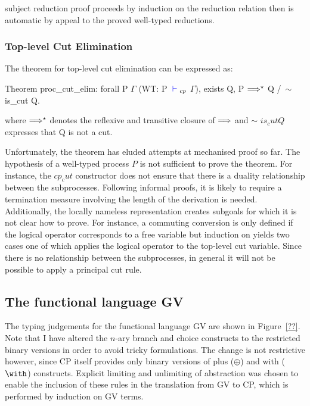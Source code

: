 
subject reduction proof proceeds by induction on the reduction relation then
is automatic by appeal to the proved well-typed reductions.


\subsubsection{Top-level Cut Elimination}

The theorem for top-level cut elimination can be expressed as:
\begin{coq}
Theorem proc_cut_elim:
  forall P $\Gamma$
         (WT: P ${\color{blue} {} \vdash {}}_{cp}$ $\Gamma$),
    exists Q, P $\Longrightarrow^\star$ Q /\ $\sim$ is_cut Q.
\end{coq}

where $\Longrightarrow^\star$ denotes the reflexive and transitive closure of
$\Longrightarrow$ and $\sim$ \coqe$is_cut Q$ expresses that Q is not a cut.

Unfortunately, the theorem has eluded attempts at mechanised proof so far. The
hypothesis of a well-typed process \coqe$P$ is not sufficient to prove the
theorem. For instance, the \coqe$cp_cut$ constructor does not ensure that
there is a duality relationship between the subprocesses. Following informal
proofs, it is likely to require a termination measure involving the length of
the derivation is needed. Additionally, the locally nameless representation
creates subgoals for which it is not clear how to prove. For instance, a
commuting conversion is only defined if the logical operator corresponds to a
free variable but induction on  yields two cases one of which applies
the logical operator to the top-level cut variable. Since there is no
relationship between the subprocesses, in general it will not be possible to
apply a principal cut rule.

\subsection{The functional language GV}\label{sec:gv}

%

The typing judgements for the functional language GV are shown in
Figure~\ref{??}. Note that I have altered the $n$-ary branch and choice
constructs to the restricted binary versions in order to avoid tricky
formulations. The change is not restrictive however, since CP itself provides
only binary versions of plus ($\oplus$) and with ($\with$)
constructs. Explicit limiting and unlimiting of abstraction was chosen to
enable the inclusion of these rules in the translation from GV to CP, which is
performed by induction on GV terms.

